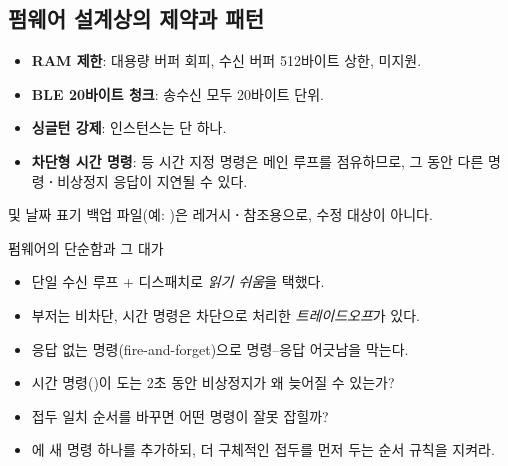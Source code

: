 \subsection{펌웨어 설계상의 제약과 패턴}

\begin{infobox}[title=주요 제약]
\begin{itemize}
  \item \textbf{RAM 제한}: 대용량 버퍼 회피, 수신 버퍼 512바이트 상한,
         미지원.
  \item \textbf{BLE 20바이트 청크}: 송수신 모두 20바이트 단위.
  \item \textbf{싱글턴 강제}:  인스턴스는 단 하나.
  \item \textbf{차단형 시간 명령}:  등 시간 지정 명령은 메인 루프를
        점유하므로, 그 동안 다른 명령\textbf{·}비상정지 응답이 지연될 수 있다.
\end{itemize}
\end{infobox}

 및 날짜 표기 백업 파일(예: )은
레거시\textbf{·}참조용으로, 수정 대상이 아니다.

\begin{teachbox}{펌웨어의 단순함과 그 대가}
\begin{itemize}
  \item 단일 수신 루프 +  디스패치로 \emph{읽기 쉬움}을 택했다.
  \item 부저는 비차단, 시간 명령은 차단으로 처리한 \emph{트레이드오프}가 있다.
  \item 응답 없는 명령(fire-and-forget)으로 명령--응답 어긋남을 막는다.
\end{itemize}
\begin{itemize}
  \item 시간 명령()이 도는 2초 동안 비상정지가 왜 늦어질 수 있는가?
  \item 접두 일치 순서를 바꾸면 어떤 명령이 잘못 잡힐까?
\end{itemize}
\begin{itemize}
  \item {}에 새 명령 하나를 추가하되, 더 구체적인 접두를 먼저 두는 순서 규칙을 지켜라.
\end{itemize}
\end{teachbox}

